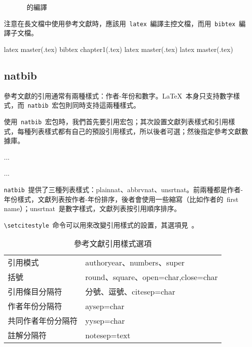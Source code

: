 \begin{figure}[htbp]
\centering
{}
\caption{\BibTeX~的編譯}
\label{fig:bibtex}
\end{figure}

注意在長文檔中使用參考文獻時，應該用~\verb|latex|~編譯主控文檔，而用~\verb|bibtex|~編譯子文檔。

\begin{code}
latex master(.tex)
bibtex chapter1(.tex)
latex master(.tex)
latex master(.tex)
\end{code}

\subsection{natbib}
參考文獻的引用通常有兩種樣式：作者-年份和數字。\LaTeX~本身只支持數字樣式，而~\verb|natbib|~宏包\citep{Daly_2007}則同時支持這兩種樣式。

使用~\verb|natbib|~宏包時，我們首先要引用宏包；其次設置文獻列表樣式和引用樣式，每種列表樣式都有自己的預設引用樣式，所以後者可選；然後指定參考文獻數據庫。
\begin{code}
\usepackage{natbib}
...



...

\end{code}

\verb|natbib|~提供了三種列表樣式：plainnat、abbrvnat、unsrtnat。前兩種都是作者-年份樣式，文獻列表按作者-年份排序，後者會使用一些縮寫（比如作者的~first name）；unsrtnat~是數字樣式，文獻列表按引用順序排序。

\verb|\setcitestyle|~命令可以用來改變引用樣式的設置，其選項見~。

\begin{table}[htbp]
\caption{參考文獻引用樣式選項}
\label{tab:citestyle}
\centering
\begin{tabular}{ll}
    \toprule
    引用模式            & authoryear、numbers、super \\
    括號                & round、square、open={char},close={char} \\
    引用條目分隔符      & 分號、逗號、citesep={char} \\
    作者年份分隔符      & aysep={char} \\
    共同作者年份分隔符  & yysep={char} \\
    註解分隔符          & notesep={text} \\
    \bottomrule
\end{tabular}
\end{table}

